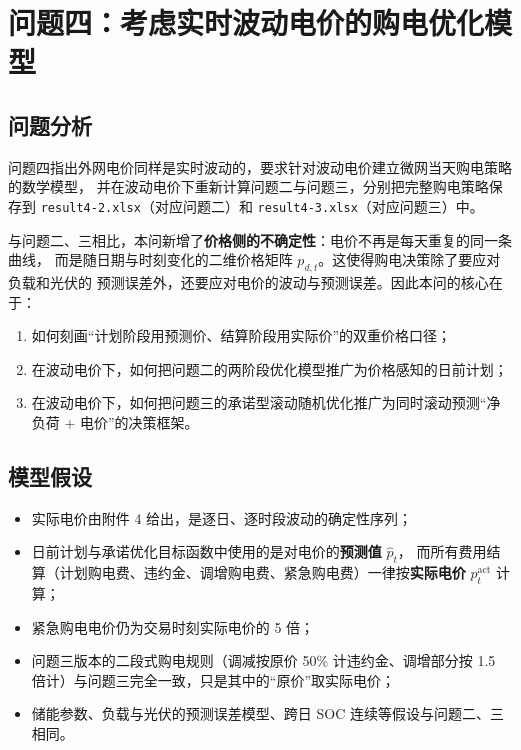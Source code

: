 \documentclass[12pt,a4paper]{article}
\begin{document}
\section{问题四：考虑实时波动电价的购电优化模型}

\subsection{问题分析}

问题四指出外网电价同样是实时波动的，要求针对波动电价建立微网当天购电策略的数学模型，
并在波动电价下重新计算问题二与问题三，分别把完整购电策略保存到
\texttt{result4-2.xlsx}（对应问题二）和 \texttt{result4-3.xlsx}（对应问题三）中。

与问题二、三相比，本问新增了\textbf{价格侧的不确定性}：电价不再是每天重复的同一条曲线，
而是随日期与时刻变化的二维价格矩阵 $p_{d,t}$。这使得购电决策除了要应对负载和光伏的
预测误差外，还要应对电价的波动与预测误差。因此本问的核心在于：

\begin{enumerate}
    \item 如何刻画“计划阶段用预测价、结算阶段用实际价”的双重价格口径；
    \item 在波动电价下，如何把问题二的两阶段优化模型推广为价格感知的日前计划；
    \item 在波动电价下，如何把问题三的承诺型滚动随机优化推广为同时滚动预测“净负荷 + 电价”的决策框架。
\end{enumerate}

\subsection{模型假设}

\begin{itemize}
    \item 实际电价由附件 4 给出，是逐日、逐时段波动的确定性序列；
    \item 日前计划与承诺优化目标函数中使用的是对电价的\textbf{预测值} $\hat{p}_t$，
          而所有费用结算（计划购电费、违约金、调增购电费、紧急购电费）一律按\textbf{实际电价} $p_t^{\text{act}}$ 计算；
    \item 紧急购电电价仍为交易时刻实际电价的 5 倍；
    \item 问题三版本的二段式购电规则（调减按原价 50\% 计违约金、调增部分按 1.5 倍计）与问题三完全一致，只是其中的“原价”取实际电价；
    \item 储能参数、负载与光伏的预测误差模型、跨日 SOC 连续等假设与问题二、三相同。
\end{itemize}
\end{document}

